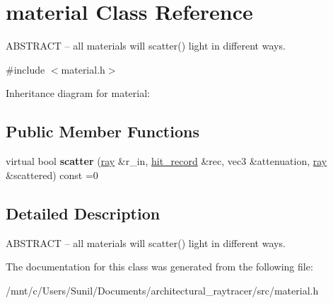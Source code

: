 \hypertarget{classmaterial}{}\section{material Class Reference}
\label{classmaterial}


A\+B\+S\+T\+R\+A\+CT -- all materials will scatter() light in different ways.  




{\ttfamily \#include $<$material.\+h$>$}



Inheritance diagram for material\+:
\subsection*{Public Member Functions}
\begin{DoxyCompactItemize}
\item 
\mbox{\label{classmaterial_a2da9f6f33e921d48b7b6e753fbe68cc7}} 
virtual bool {\bfseries scatter} (\hyperlink{classray}{ray} \&r\+\_\+in, \hyperlink{structhit__record}{hit\+\_\+record} \&rec, vec3 \&attenuation, \hyperlink{classray}{ray} \&scattered) const =0
\end{DoxyCompactItemize}


\subsection{Detailed Description}
A\+B\+S\+T\+R\+A\+CT -- all materials will scatter() light in different ways. 

The documentation for this class was generated from the following file\+:\begin{DoxyCompactItemize}
\item 
/mnt/c/\+Users/\+Sunil/\+Documents/architectural\+\_\+raytracer/src/material.\+h\end{DoxyCompactItemize}
